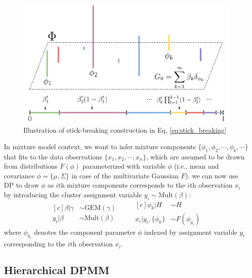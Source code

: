 \documentclass{article}
\begin{document}
\begin{figure}[ht]
    \centering
    \includegraphics[width=0.9\linewidth]{figs/stick-breaking.pdf}
    \caption{Illustration of stick-breaking construction in Eq. \ref{eq:stick_breaking}}
    \label{fig:stick_breaking}
\end{figure}
In mixture model context, we want to infer mixture components $\{\phi_{1}, \phi_{2}, \cdots, \phi_{k}, \cdots\}$ that fits to the data observations $\{x_{1}, x_{2}, \cdots, x_{n}\}$, which are assumed to be drawn from distributions $F(\phi)$ parameterized with variable $\phi$ (i.e., mean and covariance $\phi = \{\mu, \Sigma\}$ in case of the multivariate Gaussian $F$). we can now use DP to draw $\phi$ as $i$th mixture components corresponds to the $i$th observation $x_{i}$ by introducing the cluster assignment variable $y_{i} \sim \text{Mult}(\beta)$:
\begin{equation}\label{eq:dpmm}
\begin{aligned}[c]
    \beta|\gamma &\sim \text{GEM}(\gamma) \\
    y_{i}|\beta &\sim \text{Mult}(\beta)
\end{aligned}
\qquad
\begin{aligned}[c]
    \phi_{k}|H &\sim H \\
    x_{i}|y_{i},\{\phi_{k}\} &\sim F(\phi_{y_{i}}) 
\end{aligned}
\end{equation}
where $\phi_{y_{i}}$ denotes the component parameter $\phi$ indexed by assignment variable $y_{i}$ corresponding to the $i$th observation $x_{i}$.

\subsection{Hierarchical DPMM}\label{sec:hdpgmm:hdpmm}
\end{document}
